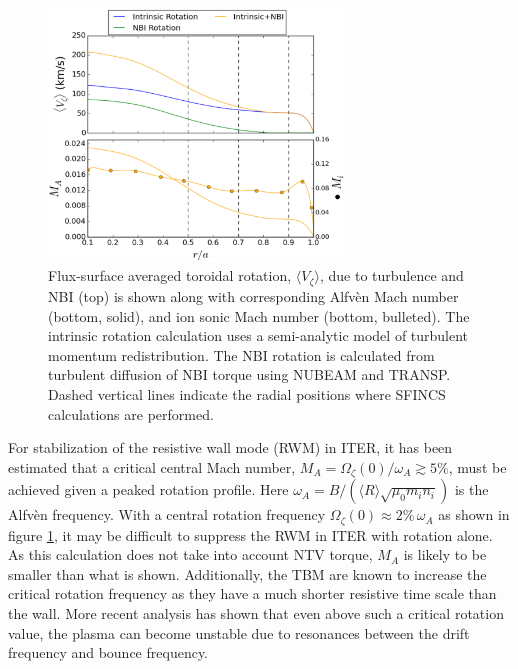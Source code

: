 \documentclass[aip, pop, preprint]{revtex4-1}
\numberwithin{figure}{section}
\numberwithin{equation}{section}
\begin{document}
\FloatBarrier

\begin{figure}[h!]
\centering
\includegraphics[width=0.7\textwidth]{figure4.eps}
\caption{\label{fig:rotation_estimate} Flux-surface averaged toroidal rotation, $\langle V_{\zeta} \rangle$, due to turbulence and NBI (top) is shown along with  corresponding Alfv\`{e}n Mach number (bottom, solid), and ion sonic Mach number (bottom, bulleted). The intrinsic rotation calculation uses a semi-analytic model of turbulent momentum redistribution.\cite{Hillesheim2015} The NBI rotation is calculated from turbulent diffusion of NBI torque using NUBEAM and TRANSP.\cite{Poli2014} Dashed vertical lines indicate the radial positions where SFINCS calculations are performed. }
\end{figure}

For stabilization of the resistive wall mode (RWM) in ITER, it has been estimated \cite{Liu2004} that a critical central Mach number, $M_A = \Omega_{\zeta}(0)/\omega_A \gtrsim 5\%$, must be achieved given a peaked rotation profile. Here $\omega_A = B/(\langle R\rangle\sqrt{\mu_0 m_i n_i})$ is the Alfv\`{e}n frequency. With a central rotation frequency $\Omega_{\zeta}(0) \approx 2\% \, \omega_A$ as shown in figure \ref{fig:rotation_estimate}, it may be difficult to suppress the RWM in ITER with rotation alone. As this calculation does not take into account NTV torque, $M_A$ is likely to be smaller than what is shown. Additionally, the TBM are known to increase the critical rotation frequency as they have a much shorter resistive time scale than the wall.\cite{Liu2004} More recent analysis has shown that even above such a critical rotation value, the plasma can become unstable due to resonances between the drift frequency and bounce frequency.\cite{Berkery2010, Liu2009}
\end{document}
